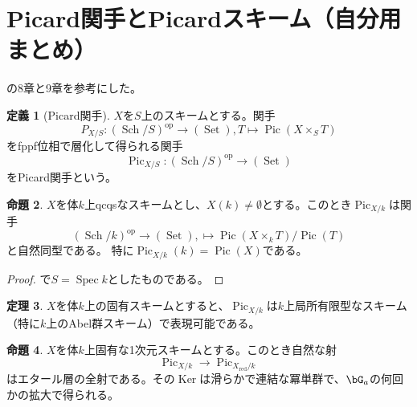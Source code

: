 \documentclass[uplatex, a4paper, dvipdfmx]{jsarticle}
\theoremstyle{definition}
\newtheorem{theorem}{定理}[section]
\newtheorem{definition}[theorem]{定義}
\newtheorem{proposition}[theorem]{命題}
\DeclareMathOperator{\Pic}{\mathrm{Pic}}
\DeclareMathOperator{\Ker}{\mathrm{Ker}}
\DeclareMathOperator{\Spec}{\mathrm{Spec}}
\DeclareMathOperator{\red}{\mathrm{red}}
\DeclareMathOperator{\Sch}{\mathrm{Sch}}
\DeclareMathOperator{\Set}{\mathrm{Set}}
\DeclareMathOperator{\op}{\mathrm{op}}
\begin{document}
\section{Picard関手とPicardスキーム（自分用まとめ）}
\cite{MR1045822}の8章と9章を参考にした。
\begin{definition}[Picard関手]
    $X$を$S$上のスキームとする。関手
    \begin{equation}
        P_{X/S} \colon (\Sch/S)^{\op} \to (\Set), T \mapsto \Pic(X \times_S T)
    \end{equation}
    をfppf位相で層化して得られる関手
    \begin{equation}
        \Pic_{X/S} \colon (\Sch/S)^{\op} \to (\Set)
    \end{equation}
    をPicard関手という。
\end{definition}
\begin{proposition}
    $X$を体$k$上qcqsなスキームとし、$X(k) \neq \emptyset$とする。このとき$\Pic_{X/k}$は関手
    \begin{equation}
        (\Sch/k)^{\op} \to (\Set), \mapsto \Pic(X \times_k T)/ \Pic(T)
    \end{equation}
    と自然同型である。
    特に$\Pic_{X/k}(k) = \Pic(X)$である。
\end{proposition}
\begin{proof}
    \cite[Proposition 8.1.4]{MR1045822}で$S = \Spec k$としたものである。
\end{proof}
\begin{theorem}
    $X$を体$k$上の固有スキームとすると、$\Pic_{X/k}$は$k$上局所有限型なスキーム（特に$k$上のAbel群スキーム）で表現可能である。
\end{theorem}
\begin{proposition}\cite[Proposition 9.2.5]{MR1045822}
    $X$を体$k$上固有な1次元スキームとする。このとき自然な射
    \begin{equation}
        \Pic_{X/k} \to \Pic_{X_{\red}/k}
    \end{equation}
    はエタール層の全射である。その$\Ker$は滑らかで連結な冪単群で、$\bG_a$の何回かの拡大で得られる。
\end{proposition}
\printbibliography[title=参考文献]
\end{document}

